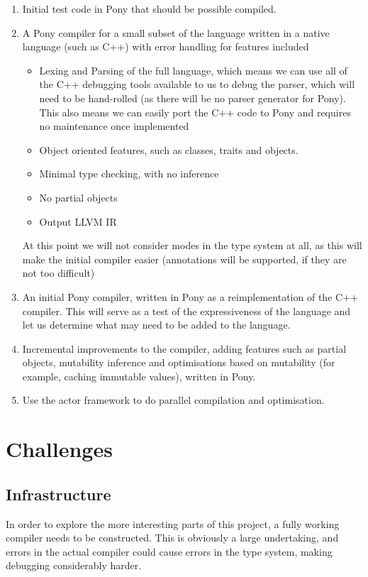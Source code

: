 \documentclass[pdftex,11pt,a4paper]{report}
\begin{document}
\begin{enumerate}
	\item Initial test code in Pony that should be possible compiled.
	\item A Pony compiler for a small subset of the language written in a native language (such as C++) with error handling for features included
		\begin{itemize}
			\item Lexing and Parsing of the full language, which means we can use all of the C++ debugging tools available to us to debug the parser, which will need to be hand-rolled (as there will be no parser generator for Pony).
				This also means we can easily port the C++ code to Pony and requires no maintenance once implemented
			\item Object oriented features, such as classes, traits and objects.
			\item Minimal type checking, with no inference
			\item No partial objects
			\item Output LLVM IR
		\end{itemize}
	At this point we will not consider modes in the type system at all, as this will make the initial compiler easier (annotations will be supported, if they are not too difficult)
	\item An initial Pony compiler, written in Pony as a reimplementation of the C++ compiler.
		This will serve as a test of the expressiveness of the language and let us determine what may need to be added to the language.
	\item Incremental improvements to the compiler, adding features such as partial objects, mutability inference and optimisations based on mutability (for example, caching immutable values), written in Pony.
    	\item Use the actor framework to do parallel compilation and optimisation.
\end{enumerate}

\section{Challenges}

\subsection{Infrastructure}

In order to explore the more interesting parts of this project, a fully working compiler needs to be constructed.
This is obviously a large undertaking, and errors in the actual compiler could cause errors in the type system, making debugging considerably harder.
\end{document}
